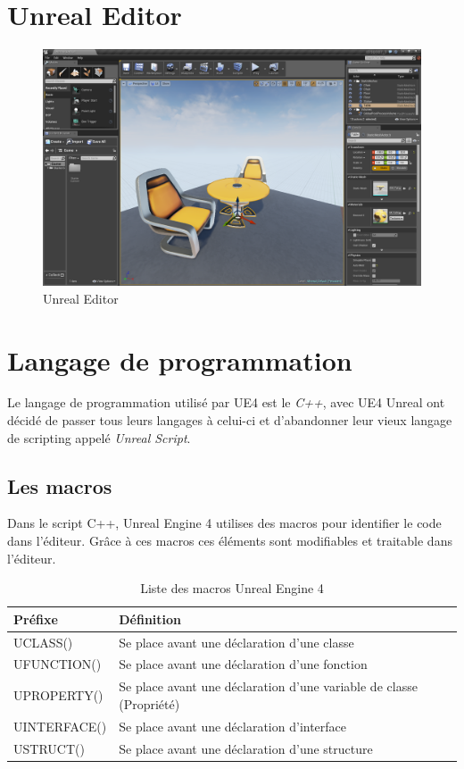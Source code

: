 \documentclass[11pt, a4paper, oneside]{article}
\begin{document}
\section{Unreal Editor}
\begin{center}
\begin{figure}[htp]
\includegraphics[scale=.39]{ue4editor}
\caption{Unreal Editor}
\end{figure}
\end{center}



\section{Langage de programmation}
Le langage de programmation utilisé par UE4 est le \textit{C++}, avec UE4 Unreal ont décidé de passer tous leurs langages à celui-ci et d'abandonner leur vieux langage de scripting appelé \textit{Unreal Script}.

\subsection{Les macros}
Dans le script C++, Unreal Engine 4 utilises des macros pour identifier le code dans l'éditeur. Grâce à ces macros ces éléments sont modifiables et traitable dans l'éditeur.
\begin{table}[h]
	\begin{center}
		\begin{tabularx}{\textwidth}{ l l }
			\hline
			\textbf{Préfixe} & \textbf{Définition}\\
			\hline
			\hline
			UCLASS() & Se place avant une déclaration d'une classe\\
			UFUNCTION() & Se place avant une déclaration d'une fonction\\
			UPROPERTY() & Se place avant une déclaration d'une variable de classe (Propriété)\\
			UINTERFACE() & Se place avant une déclaration d'interface\\
			USTRUCT() & Se place avant une déclaration d'une structure\\
			\hline
		\end{tabularx}
		\caption{Liste des macros Unreal Engine 4}
		\label{table:macros}
	\end{center}
\end{table}
\end{document}
